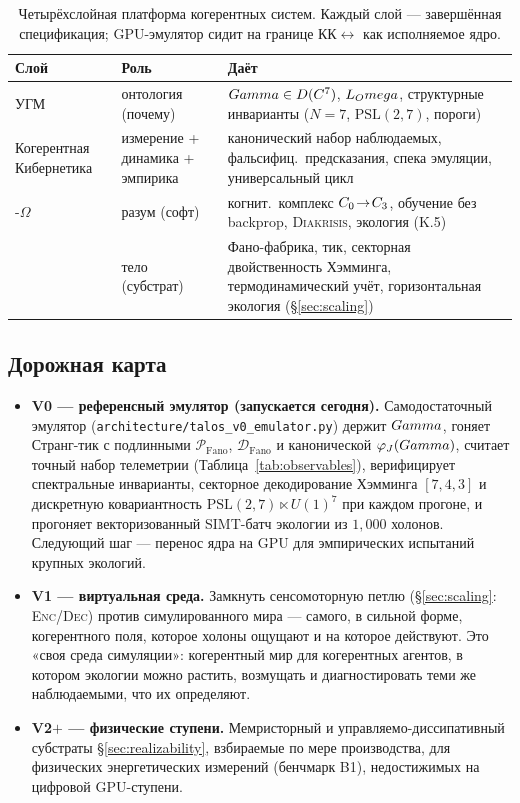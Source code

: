 \begin{table}[H]
\centering\small
\caption{Четырёхслойная платформа когерентных систем. Каждый слой --- завершённая
спецификация; GPU-эмулятор сидит на границе КК$\leftrightarrow$\TALOS{} как
исполняемое ядро.}
\label{tab:stack}
\begin{tabular}{@{}p{2.5cm}p{4.1cm}p{5.6cm}@{}}
\toprule
\textbf{Слой} & \textbf{Роль} & \textbf{Даёт} \\
\midrule
УГМ & онтология (почему) & $Gamma\in D(C^7)$, $L_Omega$, структурные инварианты ($N{=}7$, $\mathrm{PSL}(2,7)$, пороги) \\
Когерентная Кибернетика & измерение + динамика + эмпирика & канонический набор наблюдаемых, фальсифиц.\ предсказания, спека эмуляции, универсальный цикл \\
\SYNARC{}-$\Omega$ & разум (софт) & когнит.\ комплекс $C_0\!\to\!C_3$, обучение без backprop, \textsc{Diakrisis}, экология (K.5) \\
\TALOS{} & тело (субстрат) & Фано-фабрика, тик, секторная двойственность Хэмминга, термодинамический учёт, горизонтальная экология (\S\ref{sec:scaling}) \\
\bottomrule
\end{tabular}
\end{table}

\subsection{Дорожная карта}
\label{subsec:roadmap}

\begin{itemize}[leftmargin=1.5em,itemsep=1pt]
  \item \textbf{V0 --- референсный эмулятор (запускается сегодня).}
        Самодостаточный эмулятор (\texttt{architecture/talos\_v0\_emulator.py})
        держит $Gamma$, гоняет Странг-тик с подлинными $\mathcal{P}_{\mathrm{Fano}}$,
        $\mathcal{D}_{\mathrm{Fano}}$ и канонической $\varphi_J(Gamma)$, считает
        точный набор телеметрии (Таблица~\ref{tab:observables}), верифицирует
        спектральные инварианты, секторное декодирование Хэмминга $[7,4,3]$ и
        дискретную ковариантность $\mathrm{PSL}(2,7)\ltimes U(1)^7$ при каждом
        прогоне, и прогоняет векторизованный SIMT-батч экологии из $1{,}000$
        холонов. Следующий шаг --- перенос ядра на GPU для эмпирических
        испытаний крупных экологий.
  \item \textbf{V1 --- виртуальная среда.} Замкнуть сенсомоторную петлю
        (\S\ref{sec:scaling}: \textsc{Enc}/\textsc{Dec}) против симулированного
        мира --- самого, в сильной форме, когерентного поля, которое холоны
        ощущают и на которое действуют. Это «своя среда симуляции»: когерентный
        мир для когерентных агентов, в котором экологии можно растить,
        возмущать и диагностировать теми же наблюдаемыми, что их определяют.
  \item \textbf{V2$+$ --- физические ступени.} Мемристорный и
        управляемо-диссипативный субстраты \S\ref{sec:realizability}, взбираемые
        по мере производства, для физических энергетических измерений (бенчмарк
        B1), недостижимых на цифровой GPU-ступени.
\end{itemize}

